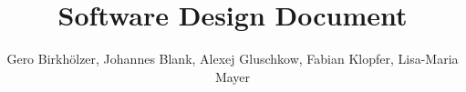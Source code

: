 \title{Software Design Document}
\author{Gero Birkhölzer, Johannes Blank, Alexej Gluschkow, Fabian Klopfer, Lisa-Maria Mayer}
\maketitle
